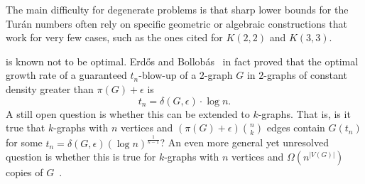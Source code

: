 The main difficulty for degenerate problems is that sharp lower bounds for the Turán numbers
often rely on specific geometric or algebraic constructions that work for very few cases,
such as the ones cited for $K(2, 2)$ and $K(3, 3)$.

 is known not to be optimal.
Erdős and Bollobás~\cite{bollobas1973structure} in fact proved that the optimal growth
rate of a guaranteed $t_n$-blow-up of a $2$-graph $G$ in $2$-graphs of constant density greater than $\pi(G) + \epsilon$ is
\[
    t_n = \delta(G, \epsilon) \cdot \log n.
\]
A still open question is whether this can be extended to $k$-graphs.
That is, is it true that $k$-graphs with $n$ vertices and  $\left(\pi(G) + \epsilon \right)  \binom{n}{k}$ edges
contain $G(t_n)$ for some $t_n = \delta(G, \epsilon) (\log n)^{\frac{1}{k-1}}$?
An even more general yet unresolved question is whether this is true for
$k$-graphs with $n$ vertices and $\Omega (n^{|V(G)|})$ copies of $G$~\cite{rodl2012complete}.